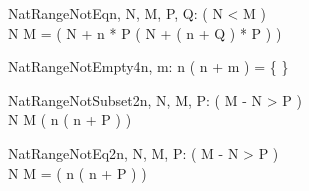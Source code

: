 \begin{theorem}{NatRangeNotEq}{n, \const N, \const M, \const P, \const Q: \nat}
\eval( N < M ) \\
N \upto M = ( N + n * P \upto ( N + ( n + Q ) * P ) )
\end{theorem}

\begin{theorem}{NatRangeNotEmpty4}{n, m: \nat}
n \upto ( n + m ) = \{ \}
\end{theorem}

\begin{theorem}{NatRangeNotSubset2}{n, \const N, \const M, \const P: \nat}
\eval( M - N > P ) \\
N \upto M \subset ( n \upto ( n + P ) )
\end{theorem}

\begin{theorem}{NatRangeNotEq2}{n, \const N, \const M, \const P: \nat}
\eval( M - N > P ) \\
N \upto M = ( n \upto ( n + P ) )
\end{theorem}